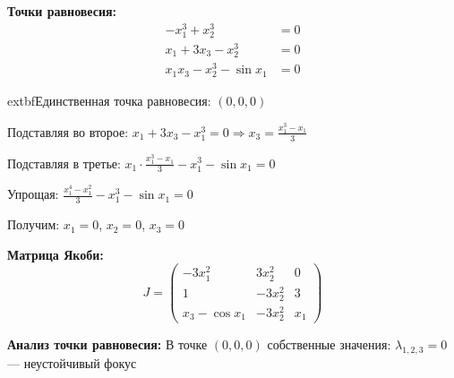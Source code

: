 \textbf{Точки равновесия:}
\begin{align}
-x_1^3 + x_2^3 &= 0 \\
x_1 + 3x_3 - x_2^3 &= 0 \\
x_1 x_3 - x_2^3 - \sin x_1 &= 0
\end{align}

	extbf{Единственная точка равновесия:} $(0, 0, 0)$

Подставляя во второе: $x_1 + 3x_3 - x_1^3 = 0 \Rightarrow x_3 = \frac{x_1^3 - x_1}{3}$

Подставляя в третье: $x_1 \cdot \frac{x_1^3 - x_1}{3} - x_1^3 - \sin x_1 = 0$

Упрощая: $\frac{x_1^4 - x_1^2}{3} - x_1^3 - \sin x_1 = 0$

Получим: $x_1 = 0$, $x_2 = 0$, $x_3 = 0$

\textbf{Матрица Якоби:}
$$J = \begin{pmatrix} 
-3x_1^2 & 3x_2^2 & 0 \\
1 & -3x_2^2 & 3 \\
x_3 - \cos x_1 & -3x_2^2 & x_1
\end{pmatrix}$$

\textbf{Анализ точки равновесия:}
В точке $(0, 0, 0)$ собственные значения:
$\lambda_{1,2,3} = 0$ --- неустойчивый фокус
